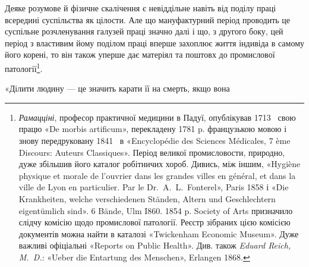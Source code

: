Деяке розумове й фізичне скалічення є невіддільне навіть від
поділу праці всередині суспільства як цілости. Але що мануфактурний
період проводить це суспільне розчленування галузей
праці значно далі і що, з другого боку, цей період з властивим
йому поділом праці вперше захоплює життя індивіда в самому
його корені, то він також уперше дає матеріял та поштовх до
промислової патології\footnote{
\emph{Рамацціні}, професор практичної медицини в Падуї, опублікував
1713~ свою працю «De morbis artificum», перекладену 1781 p.
французькою мовою і знову передруковану 1841~ в «Encyclopédie des
Sciences Médicales, 7 ème Discours: Auteurs Classiques». Період великої
промисловости, природно, дуже збільшив його каталог робітничих хороб.
Дивись, між іншим, «Hygiène physique et morale de l’ouvrier dans les
grandes villes en général, et dans la ville de Lyon en particulier. Par le
Dr.~A.~L.~Fonterel», Paris 1858 і «Die Krankheiten, welche verschiedenen
Ständen, Altern und Geschlechtern eigentümlich sind». 6 Bände, Ulm I860.
1854 p. Society of Arts призначило слідчу комісію щодо промислової
патології. Реєстр зібраних цією комісією документів можна найти в каталозі
«Twickenham Economic Museum». Дуже важливі офіціальні «Reports
on Public Health». Див. також \emph{Eduard Reich, M.~D.}: «Ueber
die Entartung des Menschen», Erlangen 1868.
}.

«Ділити людину — це значить карати її на смерть, якщо вона
\parbreak{}  %
